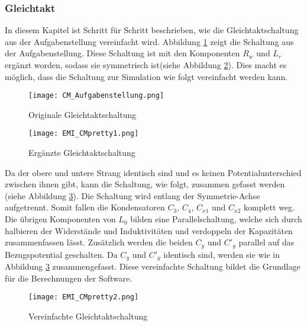 \subsubsection{Gleichtakt} \label{subsec:gleichtakt}
In diesem Kapitel ist Schritt für Schritt beschrieben, wie die Gleichtaktschaltung aus der Aufgabenstellung vereinfacht wird. Abbildung \ref{fig:orig_CMSchaltung} zeigt die Schaltung aus der Aufgabenstellung. Diese Schaltung ist mit den Komponenten $R_w$ und $L_r$ ergänzt worden, sodass sie symmetrisch ist(siehe Abbildung \ref{fig:CMSchaltung1}). Dies macht es möglich, dass die Schaltung zur Simulation wie folgt vereinfacht werden kann.
\begin{figure}[H]
	\centering
	\texttt{[image: CM\_Aufgabenstellung.png]}
	\caption{Originale Gleichtaktschaltung\cite{aufgabenstellung}}
	\label{fig:orig_CMSchaltung}
\end{figure}
\begin{figure}[H]
	\centering
	\texttt{[image: EMI\_CMpretty1.png]}
	\caption{Ergänzte Gleichtaktschaltung}
	\label{fig:CMSchaltung1}
\end{figure}
Da der obere und untere Strang identisch sind und es keinen Potentialunterschied zwischen ihnen gibt, kann die Schaltung, wie folgt, zusammen gefasst werden (siehe Abbildung \ref{fig:CMSchaltung2}). Die Schaltung wird entlang der Symmetrie-Achse aufgetrennt. Somit fallen die Kondensatoren $C_3$, $C_4$, $C_{x1}$ und $C_{x2}$ komplett weg. Die übrigen Komponenten von $L_0$ bilden eine Parallelschaltung, welche sich durch halbieren der Widerstände und Induktivitäten und verdoppeln der Kapazitäten zusammenfassen lässt. Zusätzlich werden die beiden $C_y$ und $C'_{y}$ parallel auf das Bezugspotential geschalten. Da $C_y$ und $C'_y$ identisch sind, werden sie wie in Abbildung \ref{fig:CMSchaltung2} zusammengefasst. Diese vereinfachte Schaltung bildet die Grundlage für die Berechnungen der Software.
\begin{figure}[H]
	\centering
	\texttt{[image: EMI\_CMpretty2.png]}
	\caption{Vereinfachte Gleichtaktschaltung}
	\label{fig:CMSchaltung2}
\end{figure}